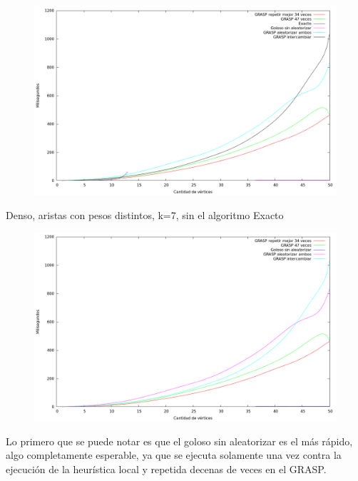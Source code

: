 \begin{figure}[H]
  \begin{center}
    \includegraphics[scale=0.35]{imagenes/ej6-denso-pesos-distintos-k7-tiempo-exacto.png}
  \end{center}
\end{figure}

Denso, aristas con pesos distintos, k=7, sin el algoritmo Exacto

\begin{figure}[H]
  \begin{center}
    \includegraphics[scale=0.35]{imagenes/ej6-denso-pesos-distintos-k7-tiempo.png}
  \end{center}
\end{figure}

Lo primero que se puede notar es que el goloso sin aleatorizar es el más
rápido, algo completamente esperable, ya que se ejecuta solamente una vez
contra la ejecución de la heurística local y repetida decenas de veces en el
GRASP.

